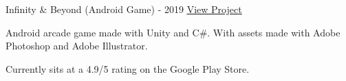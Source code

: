 \begin{cventries}
  \cventry
    {} %
    {Infinity \& Beyond (Android Game) - 2019} %
    {\href{https://play.google.com/store/apps/details?id=com.KKSGames.InifintyandBeyond}{\underline{View Project}}} %
    {} %
    {
      \begin{cvitems} %
        \item {Android arcade game made with Unity and C\#. With assets made with Adobe Photoshop and Adobe Illustrator.}
        \item {Currently sits at a 4.9/5 rating on the Google Play Store.}
      \end{cvitems}
    }


\end{cventries}
